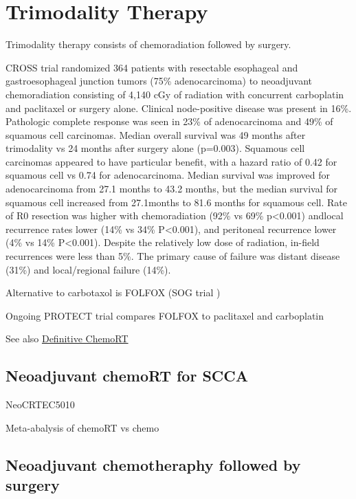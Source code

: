 \documentclass[
]{book}
\begin{document}
\hypertarget{trimodality}{%
\section{Trimodality Therapy}\label{trimodality}}

Trimodality therapy consists of chemoradiation followed by surgery.

CROSS trial randomized 364 patients with resectable esophageal and gastroesophageal junction tumors (75\% adenocarcinoma) to neoadjuvant chemoradiation consisting of 4,140 cGy of radiation with concurrent carboplatin and paclitaxel or surgery alone.\citep{vanhagen2074} Clinical node-positive disease was present in 16\%. Pathologic complete response was seen in 23\% of adenocarcinoma and 49\% of squamous cell carcinomas. Median overall survival was 49 months after trimodality vs 24 months after surgery alone (p=0.003). Squamous cell carcinomas appeared to have particular benefit, with a hazard ratio of 0.42 for squamous cell vs 0.74 for adenocarcinoma. Median survival was improved for adenocarcinoma from 27.1 months to 43.2 months, but the median survival for squamous cell increased from 27.1months to 81.6 months for squamous cell. Rate of R0 resection was higher with chemoradiation (92\% vs 69\% p\textless0.001) andlocal recurrence rates lower (14\% vs 34\% P\textless0.001), and peritoneal recurrence lower (4\% vs 14\% P\textless0.001). Despite the relatively low dose of radiation, in-field recurrences were less than 5\%. The primary cause of failure was distant disease (31\%) and local/regional failure (14\%).\citep{oppedijk385}

Alternative to carbotaxol is FOLFOX (SOG trial \citep{leichman4555})

Ongoing PROTECT trial compares FOLFOX to paclitaxel and carboplatin \citep{messager318}

See also \protect\hyperlink{eso_dcrt}{Definitive ChemoRT}

\hypertarget{neoadjuvant-chemort-for-scca}{%
\subsection{Neoadjuvant chemoRT for SCCA}\label{neoadjuvant-chemort-for-scca}}

NeoCRTEC5010 \citep{yang2796}

Meta-abalysis of chemoRT vs chemo \citep{zhaoe0202185}

\hypertarget{neoadjuvant-chemotheraphy-followed-by-surgery}{%
\subsection{Neoadjuvant chemotheraphy followed by surgery}\label{neoadjuvant-chemotheraphy-followed-by-surgery}}
\end{document}

